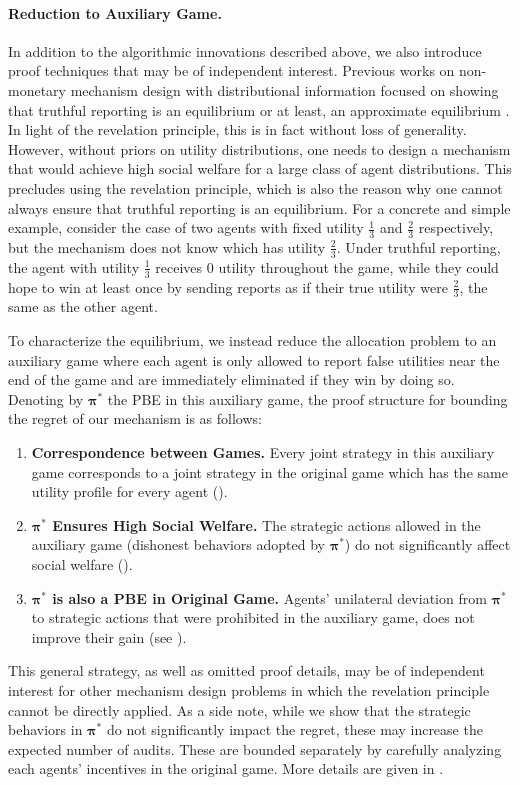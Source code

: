 \paragraph{Reduction to Auxiliary Game.}
In addition to the algorithmic innovations described above, we also introduce proof techniques that may be of independent interest. Previous works on non-monetary mechanism design with distributional information focused on showing that truthful reporting is an equilibrium \citep{balseiro2019multiagent,blanchard2024near} or at least, an approximate equilibrium \citep{gorokh2021monetary}. In light of the revelation principle, this is in fact without loss of generality. However, without priors on utility distributions, one needs to design a mechanism that would achieve high social welfare for a large class of agent distributions. This precludes using the revelation principle, which is also the reason why one cannot always ensure that truthful reporting is an equilibrium. For a concrete and simple example, consider the case of two agents with fixed utility $\frac 13$ and $\frac 23$ respectively, but the mechanism does not know which has utility $\frac 23$. Under truthful reporting, the agent with utility $\frac 13$ receives $0$ utility throughout the game, while they could hope to win at least once by sending reports as if their true utility were $\frac 23$, the same as the other agent.

To characterize the equilibrium, we instead reduce the allocation problem to an auxiliary game where each agent is only allowed to report false utilities near the end of the game and are immediately eliminated if they win by doing so. Denoting by $\bm \pi^\ast$ the PBE in this auxiliary game, the proof structure for bounding the regret of our mechanism is as follows:
\begin{enumerate}
\item \textbf{Correspondence between Games.} Every joint strategy in this auxiliary game corresponds to a joint strategy in the original game which has the same utility profile for every agent ().
\item \textbf{$\bm \pi^\ast$ Ensures High Social Welfare.} The strategic actions allowed in the auxiliary game (dishonest behaviors adopted by $\bm \pi^\ast$) do not significantly affect social welfare ().
\item \textbf{$\bm \pi^\ast$ is also a PBE in Original Game.} Agents' unilateral deviation from $\bm\pi^\ast$ to strategic actions that were prohibited in the auxiliary game, does not improve their gain (see ).
\end{enumerate}

This general strategy, as well as omitted proof details, may be of independent interest for other mechanism design problems in which the revelation principle cannot be directly applied. As a side note, while we show that the strategic behaviors in $\bm \pi^\ast$ do not significantly impact the regret, these may increase the expected number of audits. These are bounded separately by carefully analyzing each agents' incentives in the original game. More details are given in .
